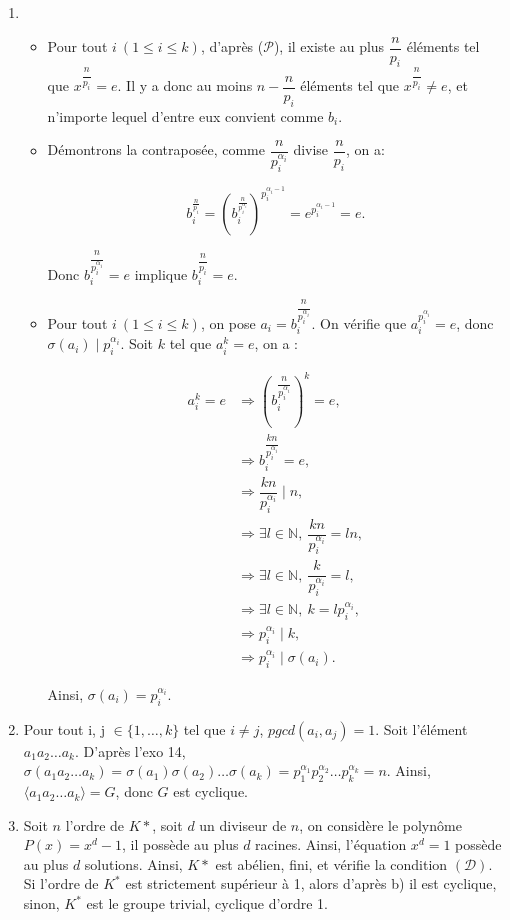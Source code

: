 
\begin{enumerate}[label=\alph*)]
    \item
    \begin{itemize}
        \item 
    Pour tout $i\ (1\leq i \leq k)$, d'après ($\mathcal{P}$), il existe au plus $\dfrac{n}{p_i}$ éléments tel que $x^{\dfrac{n}{p_i}} = e$. Il y a donc au moins $n-\dfrac{n}{p_i}$ éléments tel que $x^{\dfrac{n}{p_i}} \neq e$, et n'importe lequel d'entre eux convient comme  $b_i$.

        \item  
    Démontrons la contraposée, comme $\dfrac{n}{p_i^{\alpha_i}}$ divise $\dfrac{n}{p_i}$, on a:

\[
b_i^{\frac{n}{p_i}} = \left( b_i^{\frac{n}{p_i^{\alpha_i}}} \right)^{p_i^{\alpha_i - 1}} = e^{p_i^{\alpha_i - 1}} = e.
\]

Donc $b_i^{\dfrac{n}{p_i^{\alpha_i}}} = e$ implique $b_i^{\dfrac{n}{p_i}} = e$.
    \item   Pour tout $i\ (1\leq i \leq k)$, on pose $a_i = b_i^{\dfrac{n}{p_i^{\alpha_i}}}$. On vérifie que $a_i^{p_i^{\alpha_i}} = e$, donc $\sigma(a_i) \mid p_i^{\alpha_i}$. Soit $k$ tel que $a_i^k=e$, on a :

    \begin{align*}
        a_i^k=e &\Rightarrow  \left( b_i^{\dfrac{n}{p_i^{\alpha_i}}} \right)^k =e, \\
        & \Rightarrow b_i^{\dfrac{kn}{p_i^{\alpha_i}}} = e, \\
        &\Rightarrow \dfrac{kn}{p_i^{\alpha_i}} \mid n, \\
        &\Rightarrow \exists l\in \mathbb{N},\  \dfrac{kn}{p_i^{\alpha_i}} = ln, \\
        &\Rightarrow \exists l\in \mathbb{N},\  \dfrac{k}{p_i^{\alpha_i}} = l, \\
        &\Rightarrow \exists l\in \mathbb{N},\ k = lp_i^{\alpha_i}, \\
        &\Rightarrow p_i^{\alpha_i} \mid k, \\
        &\Rightarrow p_i^{\alpha_i} \mid \sigma(a_i).
    \end{align*}

Ainsi, $\sigma(a_i) = p_i^{\alpha_i}$.

  \end{itemize}
    \item Pour tout i, j $\in \{ 1,\ldots, k \}$ tel que $i\neq j$, $pgcd(a_i,a_j) = 1$. Soit l'élément $a_1a_2\ldots a_k$. D'après l'exo 14, $\sigma (a_1a_2\ldots a_k) = \sigma(a_1)\sigma(a_2)\ldots\sigma(a_k) = p_1^{\alpha_1}p_2^{\alpha_2}\ldots p_k^{\alpha_k} = n$. Ainsi, $\langle a_1a_2\ldots a_k \rangle = G $, donc $G$ est cyclique.
    \item Soit $n$ l'ordre de $K*$, soit $d$ un diviseur de $n$, on considère le polynôme $P(x) = x^d - 1$, il possède au plus $d$ racines. Ainsi, l'équation $x^d = 1$ possède au plus $d$ solutions. Ainsi, $K*$ est abélien, fini, et vérifie la condition $(\mathcal{D})$. Si l'ordre de $K^*$ est strictement supérieur à 1, alors d'après b) il est cyclique, sinon, $K^*$ est le groupe trivial, cyclique d'ordre 1.


\end{enumerate}
